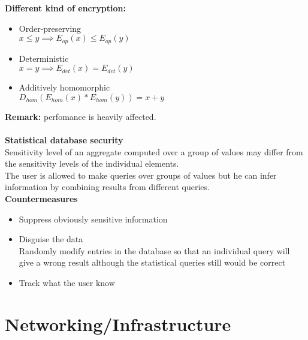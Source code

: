\documentclass[10pt,a4paper]{book}
\begin{document}
\textbf{Different kind of encryption:}
\begin{itemize}
\item Order-preserving\\
$x \le y \implies E_{op}(x) \le E_{op}(y)$
\item Deterministic\\
$x=y \implies E_{det}(x) = E_{det}(y)$
\item Additively homomorphic\\
$D_{hom}(E_{hom}(x)*E_{hom}(y)) = x+y$
\end{itemize}
\textbf{Remark:} perfomance is heavily affected.\\\\
\textbf{Statistical database security}\\
Sensitivity level of an aggregate computed over a group of values may differ from the sensitivity levels of the individual elements.\\
The user is allowed to make queries over groups of values but he can infer information by combining results from different queries.\\
\textbf{Countermeasures}
\begin{itemize}
\item Suppress obviously sensitive information
\item Disguise the data \\
Randomly modify entries in the database so that an individual
query will give a wrong result although the statistical queries still would be correct
\item Track what the user know
\end{itemize}
\chapter{Networking/Infrastructure}
\end{document}
